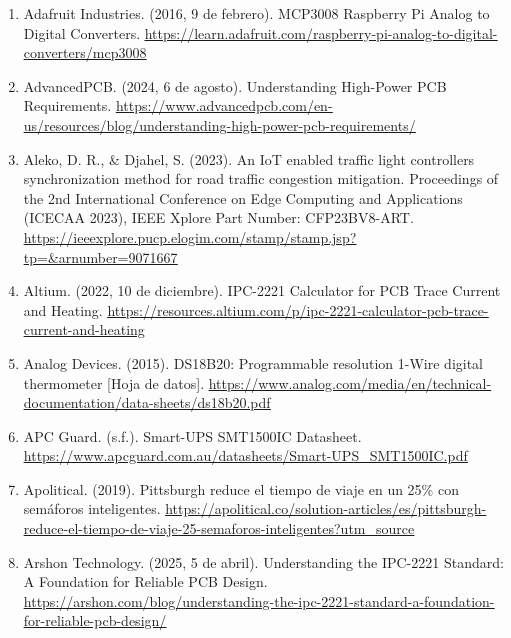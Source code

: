 \documentclass[12pt,a4paper,oneside]{report}
\providecommand{\ul}[1]{\underline{#1}}
\begin{document}
\begin{enumerate}
\def\labelenumi{\arabic{enumi}.}
\item
  Adafruit Industries. (2016, 9 de febrero). MCP3008 \textbar{} Raspberry Pi Analog to Digital Converters. \href{https://learn.adafruit.com/raspberry-pi-analog-to-digital-converters/mcp3008}{\ul{https://learn.adafruit.com/raspberry-pi-analog-to-digital-converters/mcp3008}}
\item
  AdvancedPCB. (2024, 6 de agosto). Understanding High-Power PCB Requirements. \href{https://www.advancedpcb.com/en-us/resources/blog/understanding-high-power-pcb-requirements/}{\ul{https://www.advancedpcb.com/en-us/resources/blog/understanding-high-power-pcb-requirements/}}
\item
  Aleko, D. R., \& Djahel, S. (2023). An IoT enabled traffic light controllers synchronization method for road traffic congestion mitigation. Proceedings of the 2nd International Conference on Edge Computing and Applications (ICECAA 2023), IEEE Xplore Part Number: CFP23BV8-ART. \href{https://ieeexplore.pucp.elogim.com/stamp/stamp.jsp?tp=&arnumber=9071667}{\ul{https://ieeexplore.pucp.elogim.com/stamp/stamp.jsp?tp=\&arnumber=9071667}}
\item
  Altium. (2022, 10 de diciembre). IPC-2221 Calculator for PCB Trace Current and Heating. \href{https://resources.altium.com/p/ipc-2221-calculator-pcb-trace-current-and-heating}{\ul{https://resources.altium.com/p/ipc-2221-calculator-pcb-trace-current-and-heating}}
\item
  Analog Devices. (2015). DS18B20: Programmable resolution 1-Wire digital thermometer {[}Hoja de datos{]}. \href{https://www.analog.com/media/en/technical-documentation/data-sheets/ds18b20.pdf}{\ul{https://www.analog.com/media/en/technical-documentation/data-sheets/ds18b20.pdf}}
\item
  APC Guard. (s.f.). Smart-UPS SMT1500IC Datasheet. \href{https://www.apcguard.com.au/datasheets/Smart-UPS_SMT1500IC.pdf}{\ul{https://www.apcguard.com.au/datasheets/Smart-UPS\_SMT1500IC.pdf}}
\item
  Apolitical. (2019). Pittsburgh reduce el tiempo de viaje en un 25\% con semáforos inteligentes. \href{https://apolitical.co/solution-articles/es/pittsburgh-reduce-el-tiempo-de-viaje-25-semaforos-inteligentes?utm_source}{\ul{https://apolitical.co/solution-articles/es/pittsburgh-reduce-el-tiempo-de-viaje-25-semaforos-inteligentes?utm\_source}}
\item
  Arshon Technology. (2025, 5 de abril). Understanding the IPC-2221 Standard: A Foundation for Reliable PCB Design. \href{https://arshon.com/blog/understanding-the-ipc-2221-standard-a-foundation-for-reliable-pcb-design/}{\ul{https://arshon.com/blog/understanding-the-ipc-2221-standard-a-foundation-for-reliable-pcb-design/}}

\end{enumerate}
\end{document}

